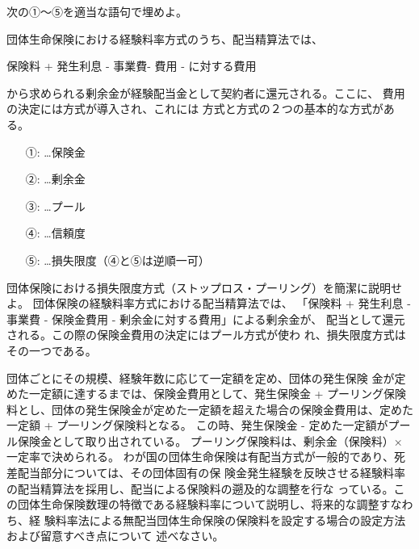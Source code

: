 \documentclass[report,gutter=10mm,fore-edge=10mm,uplatex,dvipdfmx]{jlreq}
\begin{document}
次の①～⑤を適当な語句で埋めよ。

団体生命保険における経験料率方式のうち、配当精算法では、

保険料 + 発生利息 - 事業費- 費用 - に対する費用

から求められる剰余金が経験配当金として契約者に還元される。ここに、
費用の決定には方式が導入され、これには
方式と方式の２つの基本的な方式がある。
\answer{}
\begin{itemize}
\item[ ①: ] …保険金
\item[ ②: ] …剰余金
\item[ ③: ] …プール
\item[ ④: ] …信頼度
\item[ ⑤: ] …損失限度（④と⑤は逆順一可）
\end{itemize}

団体保険における損失限度方式（ストップロス・プーリング）を簡潔に説明せよ。
\answer{}
団体保険の経験料率方式における配当精算法では、
「保険料 + 発生利息 - 事業費 - 保険金費用 - 剰余金に対する費用」による剰余金が、
配当として還元される。この際の保険金費用の決定にはプール方式が使わ
れ、損失限度方式はその一つである。

団体ごとにその規模、経験年数に応じて一定額を定め、団体の発生保険
金が定めた一定額に達するまでは、保険金費用として、発生保険金 + プーリング保険料とし、団体の発生保険金が定めた一定額を超えた場合の保険金費用は、定めた一定額 + プ一リング保険料となる。
この時、発生保険金 - 定めた一定額がプール保険金として取り出されている。
プーリング保険料は、剰余金（保険料）×一定率で決められる。
わが国の団体生命保険は有配当方式が一般的であり、死差配当部分については、その団体固有の保
険金発生経験を反映させる経験料率の配当精算法を採用し、配当による保険料の遡及的な調整を行な
っている。この団体生命保険数理の特徴である経験料率について説明し、将来的な調整すなわち、経
験料率法による無配当団体生命保険の保険料を設定する場合の設定方法および留意すべき点について
述べなさい。
\answer{}
\end{document}
